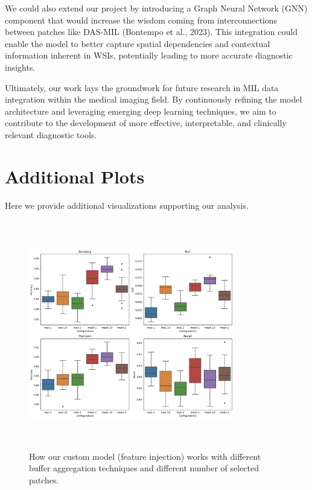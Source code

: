 \documentclass[10pt,twocolumn]{article}
\begin{document}
We could also extend our project by introducing a Graph Neural Network (GNN) component that would increase the wisdom coming from interconnections between patches like DAS-MIL (Bontempo et al., 2023)\cite{10.1007/978-3-031-43907-0_24}. This integration could enable the model to better capture spatial dependencies and contextual information inherent in WSIs, potentially leading to more accurate diagnostic insights. 

Ultimately, our work lays the groundwork for future research in MIL data integration within the medical imaging field. By continuously refining the model architecture and leveraging emerging deep learning techniques, we aim to contribute to the development of more effective, interpretable, and clinically relevant diagnostic tools.





\onecolumn
\newpage

\appendix
\section{Additional Plots}

Here we provide additional visualizations supporting our analysis.

\begin{figure}[!htb]
    \centering
    \includegraphics[width=0.8\textwidth, height=10cm]{images/comparison_mean_ntop_buffermil.png}
    \caption{How our custom model (feature injection) works with different buffer aggregation techniques and different number of selected patches.}
    \label{fig:comparison_mean_ntop}
\end{figure}
\end{document}
